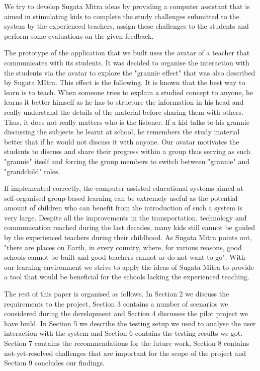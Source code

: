 \documentclass[a4paper]{article}
\begin{document}
We try to develop Sugata Mitra ideas by providing a computer assistant that is aimed in stimulating kids to complete the study challenges submitted to the system by the experienced teachers, assign these challenges to the students and perform some evaluations on the given feedback.

The prototype of the application that we built uses the avatar of a teacher that communicates with its students. It was decided to organise the interaction with the students via the avatar to explore the "grannie effect" that was also described by Sugata MItra. This effect is the following. It is known that the best way to learn is to teach. When someone tries to explain a studied concept to anyone, he learns it better himself as he has to structure the information in his head and really understand the details of the material before sharing them with others. Thus, it does not really matters who is the listener. If a kid talks to his grannie discussing the subjects he learnt at school, he remembers the study material better that if he would not discuss it with anyone. Our avatar motivates the students to discuss and share their progress within a group thus serving as such "grannie" itself and forcing the group members to switch between "grannie" and "grandchild" roles.

If implemented correctly, the computer-assisted educational systems aimed at self-organised group-based learning can be extremely useful as the potential amount of children who can benefit from the introduction of such a system is very large. Despite all the improvements in the transportation, technology and communication reached during the last decades, many kids still cannot be guided by the experienced teachers during their childhood. As Sugata Mitra points out, "there are places on Earth, in every country, where, for various reasons, good schools cannot be built and good teachers cannot or do not want to go". With our learning environment we strive to apply the ideas of Sugata Mitra to provide a tool that would be beneficial for the schools lacking the experienced teaching.

The rest of this paper is organised as follows. In Section 2 we discuss the requirements to the project, Section 3 contains a number of scenarios we considered during the development and Section 4 discusses the pilot project we have build. In Section 5 we describe the testing setup we used to analyse the user interaction with the system and Section 6 contains the testing results we got. Section 7 contains the recommendations for the future work, Section 8 contains not-yet-resolved challenges that are important for the scope of the project and Section 9 concludes our findings. 
\end{document}
